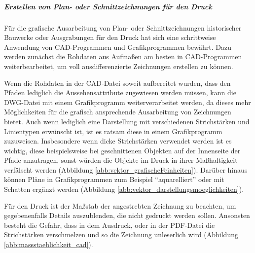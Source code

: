 \subparagraph{Erstellen von Plan- oder Schnittzeichnungen für den Druck}
Für die grafische Ausarbeitung von Plan- oder Schnittzeichnungen historischer Bauwerke oder Ausgrabungen für den Druck hat sich eine schrittweise Anwendung von CAD-Programmen und Grafikprogrammen bewährt. Dazu werden zunächst die Rohdaten aus Aufmaßen am besten in CAD-Programmen weiterbearbeitet, um voll ausdifferenzierte Zeichnungen erstellen zu können. 

Wenn die Rohdaten in der CAD-Datei soweit aufbereitet wurden, dass den Pfaden lediglich die Aussehensattribute zugewiesen werden müssen, kann die DWG-Datei mit einem Grafikprogramm weiterverarbeitet werden, da dieses mehr Möglichkeiten für die grafisch ansprechende Ausarbeitung von Zeichnungen bietet. Auch wenn lediglich eine Darstellung mit verschiedenen Strichstärken und Linientypen erwünscht ist, ist es ratsam diese in einem Grafikprogramm zuzuweisen. Insbesondere wenn dicke Strichstärken verwendet werden ist es wichtig, diese beispielsweise bei geschnittenen Objekten auf der Innenseite der Pfade anzutragen, sonst würden die Objekte im Druck in ihrer Maßhaltigkeit verfälscht werden (Abbildung \ref{abb:vektor_grafischeFeinheiten}). Darüber hinaus können Pläne in Grafikprogrammen zum Beispiel "`aquarelliert"' oder mit Schatten ergänzt werden (Abbildung \ref{abb:vektor_darstellungsmoeglichkeiten}).

Für den Druck ist der Maßstab der angestrebten Zeichnung zu beachten, um gegebenenfalls Details auszublenden, die nicht gedruckt werden sollen. Ansonsten besteht die Gefahr, dass in dem Ausdruck, oder in der PDF-Datei die Strichstärken verschmelzen und so die Zeichnung unleserlich wird (Abbildung \ref{abb:massstaeblichkeit_cad}). 

